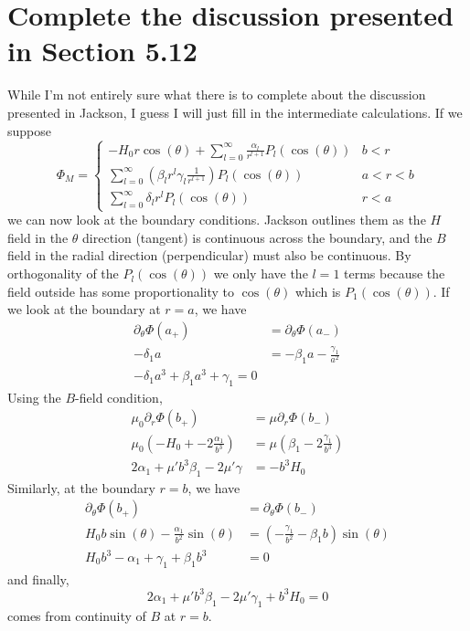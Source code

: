 \documentclass[a4paper,twoside]{article}
\begin{document}
\section{Complete the discussion presented in Section 5.12}
\begin{problem}
    While I'm not entirely sure what there is to complete about the discussion presented in Jackson, I guess I will just fill in the intermediate calculations. If we suppose
    \begin{equation}
        \Phi_M =
        \begin{cases}
            -H_0 r \cos(\theta) + \sum_{l=0}^{\infty} \frac{\alpha_l}{r^{l+1}} P_l(\cos(\theta)) & b < r\\
            \sum_{l=0}^{\infty} \left( \beta_l r^l \gamma_l \frac{1}{r^{l+1}} \right) P_l(\cos(\theta)) & a < r < b\\
            \sum_{l=0}^{\infty} \delta_l r^l P_l(\cos(\theta)) & r < a
        \end{cases}
    \end{equation}
    we can now look at the boundary conditions. Jackson outlines them as the $ H $ field in the $ \theta $ direction (tangent) is continuous across the boundary, and the $ B $ field in the radial direction (perpendicular) must also be continuous. By orthogonality of the $ P_l(\cos(\theta)) $ we only have the $ l=1 $ terms because the field outside has some proportionality to $ \cos(\theta) $ which is $ P_1(\cos(\theta)) $. If we look at the boundary at $ r = a $, we have
    \begin{align}
        \partial_\theta \Phi(a_+) &= \partial_\theta \Phi(a_-)\\
        - \delta_1 a &= -\beta_1 a - \frac{\gamma_1}{a^2}\\
        -\delta_1 a^3 + \beta_1 a^3 + \gamma_1 = 0
    \end{align}
    Using the $ B $-field condition,
    \begin{align}
        \mu_0\partial_r\Phi(b_+) &= \mu\partial_r\Phi(b_-)\\
        \mu_0 (-H_0 + -2 \frac{\alpha_1}{b^3}) &= \mu(\beta_1 - 2 \frac{\gamma_1}{b^3})\\
        2 \alpha_1 + \mu' b^3 \beta_1 - 2 \mu' \gamma &= -b^3 H_0
    \end{align}
    Similarly, at the boundary $ r = b $, we have 
    \begin{align}
        \partial_\theta \Phi(b_+) &= \partial_\theta \Phi(b_-)\\
        H_0 b \sin(\theta) - \frac{\alpha_1}{b^2} \sin(\theta) &= \left( - \frac{\gamma_1}{b^2} - \beta_1 b \right) \sin(\theta)\\
        H_0 b^3 - \alpha_1 + \gamma_1 + \beta_1 b^3 &= 0
        \end{align}
    and finally,
    \begin{equation}
        2 \alpha_1 + \mu' b^3 \beta_1 - 2 \mu' \gamma_1 + b^3 H_0 = 0
    \end{equation}
    comes from continuity of $ B $ at $ r = b $.
    

\end{problem}
\end{document}
